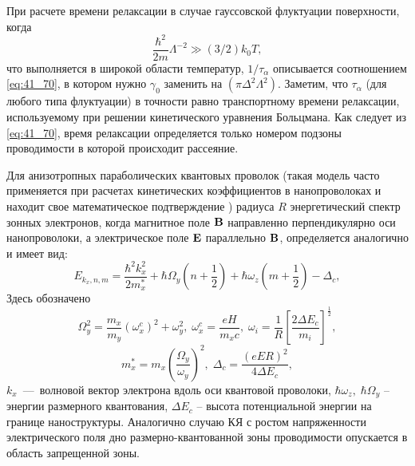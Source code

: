 При расчете времени релаксации в случае гауссовской флуктуации поверхности, когда
\[
\frac{\hbar^2 }{2m} \Lambda^{-2} \gg (3/2)k_0 T ,
\]
что выполняется в широкой области температур, $1 / \tau_{\alpha }$ описывается соотношением \eqref{eq:41_70}, в котором нужно $\gamma_0 $ заменить на $(\pi \Delta^2 \Lambda^2)$. Заметим, что $\tau_{\alpha } $ (для любого типа флуктуации) в точности равно транспортному времени релаксации, используемому при решении кинетического уравнения Больцмана. Как следует из \eqref{eq:41_70}, время релаксации определяется только номером подзоны проводимости в которой происходит рассеяние. 

Для анизотропных параболических квантовых проволок (такая модель часто применяется при расчетах кинетических коэффициентов в нанопроволоках \cite{Geiler1998,Geiler1999,Cros1992} и находит свое математическое подтверждение \cite{Beenakker1991}) радиуса $R$ энергетический спектр зонных электронов, когда магнитное поле $\boldsymbol{\mathbf{B}}$ направленно перпендикулярно оси нанопроволоки, а электрическое поле $\boldsymbol{\mathbf{E}}$ параллельно $\boldsymbol{\mathbf{B}}$, определяется аналогично \cite{Geiler1998} и имеет вид:
\begin{equation}
E_{k_x,n,m}=\frac{{\hbar }^2k^2_x}{2m^*_x}+\hbar {\Omega }_y\left(n+\frac{1}{2}\right)+\hbar {\omega }_z\left(m+\frac{1}{2}\right)-{\Delta }_c, 
\end{equation}
Здесь обозначено
\[
\Omega^2_y=\frac{m_x}{m_y}{\left({\omega }^c_x\right)}^2+\omega^2_y,\;
\omega^c_x=\frac{eH}{m_x c},\;
\omega_i=\frac{1}{R}{\left[\frac{2 \Delta E_c}{m_i}\right]}^{\frac{1}{2}},
\]
\[
m^*_x=m_x{\left(\frac{{\Omega }_y}{{\omega }_y}\right)}^2,\;
\Delta_c=\frac{{\left(eER\right)}^2}{4\Delta E_c},
\]
$k_x$~---~волновой вектор электрона вдоль оси квантовой проволоки, $\hbar \omega_z,\; \hbar \Omega_y$ -- энергии размерного квантования, $\Delta E_c$ -- высота потенциальной энергии на границе наноструктуры.
Аналогично случаю КЯ с ростом напряженности электрического поля дно размерно-квантованной зоны проводимости опускается в область запрещенной зоны.

